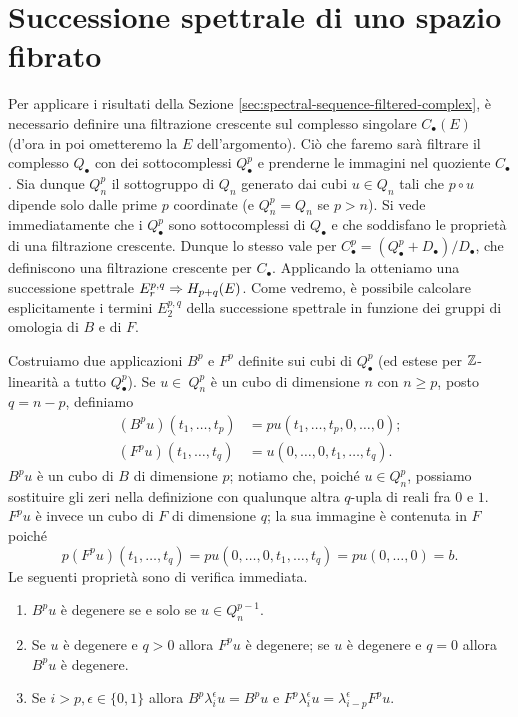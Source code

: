 \section{Successione spettrale di uno spazio fibrato}
Per applicare i risultati della Sezione \ref{sec:spectral-sequence-filtered-complex}, è necessario definire una filtrazione crescente sul complesso singolare $C_\bullet(E)$ (d'ora in poi ometteremo la $E$ dell'argomento). Ciò che faremo sarà filtrare il complesso $Q_\bullet$ con dei sottocomplessi $Q^p_\bullet$ e prenderne le immagini nel quoziente $C_\bullet$. Sia dunque $Q^p_n$ il sottogruppo di $Q_n$ generato dai cubi $u\in Q_n$ tali che $p\circ u$ dipende solo dalle prime $p$ coordinate (e $Q^p_n=Q_n$ se $p>n$). Si vede immediatamente che i $Q^p_\bullet$ sono sottocomplessi di $Q_\bullet$ e che soddisfano le proprietà di una filtrazione crescente. Dunque lo stesso vale per $C^p_\bullet=(Q^p_\bullet+D_\bullet)/D_\bullet$, che definiscono una filtrazione crescente per $C_\bullet$. Applicando la  otteniamo una successione spettrale $E^{p,q}_r\Rightarrow H_{p+q}(E)$. Come vedremo, è possibile calcolare esplicitamente i termini $E^{p,q}_2$ della successione spettrale in funzione dei gruppi di omologia di $B$ e di $F$.

Costruiamo due applicazioni $B^p$ e $F^p$ definite sui cubi di $Q^p_\bullet$ (ed estese per $\mathbb{Z}$-linearità a tutto $Q^p_\bullet$). Se $u\in\ Q^p_n$ è un cubo di dimensione $n$ con $n\ge p$, posto $q=n-p$, definiamo
\begin{align*}
(B^pu)(t_1,\ldots,t_p)&=pu(t_1,\ldots,t_p,0,\ldots,0);\\
(F^pu)(t_1,\ldots,t_q)&=u(0,\ldots,0,t_1,\ldots,t_q).
\end{align*}
$B^pu$ è un cubo di $B$ di dimensione $p$; notiamo che, poiché $u\in Q^p_n$, possiamo sostituire gli zeri nella definizione con qualunque altra $q$-upla di reali fra $0$ e $1$. $F^pu$ è invece un cubo di $F$ di dimensione $q$; la sua immagine è contenuta in $F$ poiché
$$
p(F^pu)(t_1,\ldots,t_q)=pu(0,\ldots,0,t_1,\ldots,t_q)=pu(0,\ldots,0)=b.
$$
Le seguenti proprietà sono di verifica immediata.
\begin{enumerate}
\item\label{spectral-sequence-of-fibration:pr1} $B^pu$ è degenere se e solo se $u\in Q^{p-1}_n$.
\item\label{spectral-sequence-of-fibration:pr2} Se $u$ è degenere e $q>0$ allora $F^pu$ è degenere; se $u$ è degenere e $q=0$ allora $B^pu$ è degenere.
\item\label{spectral-sequence-of-fibration:pr3} Se $i>p,\epsilon\in\{0,1\}$ allora $B^p\lambda^\epsilon_iu=B^pu$ e $F^p\lambda^\epsilon_iu=\lambda^\epsilon_{i-p}F^pu$.
\end{enumerate}

